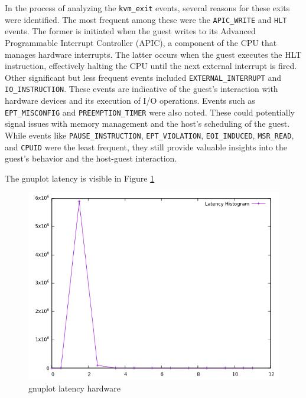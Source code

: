 \documentclass[MMR,Master,english]{twbook}
\begin{document}
\noindent In the process of analyzing the \texttt{kvm\_exit} events, several reasons for these exits were identified. The most frequent among these were the \texttt{APIC\_WRITE} and \texttt{HLT} events. The former is initiated when the guest writes to its Advanced Programmable Interrupt Controller (APIC), a component of the CPU that manages hardware interrupts. The latter occurs when the guest executes the HLT instruction, effectively halting the CPU until the next external interrupt is fired. Other significant but less frequent events included \texttt{EXTERNAL\_INTERRUPT} and \texttt{IO\_INSTRUCTION}. These events are indicative of the guest's interaction with hardware devices and its execution of I/O operations. Events such as \texttt{EPT\_MISCONFIG} and \texttt{PREEMPTION\_TIMER} were also noted. These could potentially signal issues with memory management and the host's scheduling of the guest. While events like \texttt{PAUSE\_INSTRUCTION}, \texttt{EPT\_VIOLATION}, \texttt{EOI\_INDUCED}, \texttt{MSR\_READ}, and \texttt{CPUID} were the least frequent, they still provide valuable insights into the guest's behavior and the host-guest interaction.

The gnuplot latency is visible in Figure \ref{fig:gnuplot_max_latency_hardware}
\begin{figure}[H]
	\centering
	\includegraphics[width=0.8\columnwidth]{masterthesis-documentation/docs/sigmatek/xenomai/hardware/gnuplot_max_latency_hardware.png}
	\caption[gnuplot latency hardware]{gnuplot latency hardware}
	\label{fig:gnuplot_max_latency_hardware}
\end{figure}
\end{document}
